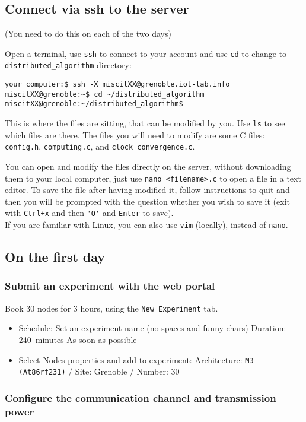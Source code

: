 \documentclass[oneside]{article}
\begin{document}
\subsection{Connect via ssh to the server}
(You need to do this on each of the two days)

Open a terminal, use \verb=ssh= to connect to your account and use \verb=cd= to change to \verb=distributed_algorithm= directory:
\begin{verbatim}your_computer:$ ssh -X miscitXX@grenoble.iot-lab.info
miscitXX@grenoble:~$ cd ~/distributed_algorithm
miscitXX@grenoble:~/distributed_algorithm$
\end{verbatim}
This is where the files are sitting, that can be modified by you.
Use \verb=ls= to see which files are there. 
The files you will need to modify are some C files: \verb=config.h=, \verb=computing.c=, and \verb=clock_convergence.c=.

You can open and modify the files directly on the server, without downloading
them to your local computer, just use \verb=nano <filename>.c= to open a file in
a text editor. To save the file after having modified it, follow instructions to
quit and then you will be prompted with the question whether you wish to save it
(exit with \verb=Ctrl+x= and then \verb='O'= and \verb=Enter= to save).\\
If you are familiar with Linux, you can also use \verb=vim= (locally), instead of \verb=nano=.

\subsection{On the first day}


\subsubsection{Submit an experiment with the web portal}
Book 30 nodes for 3 hours, using the \verb=New Experiment= tab.
\begin{itemize}
\item Schedule:
\subitem Set an experiment name (no spaces and funny chars)
\subitem Duration: 240~minutes
\subitem As soon as possible
\item Select Nodes properties and add to experiment: 
\subitem Architecture: \texttt{M3 (At86rf231)} / Site: Grenoble / Number: $30$
\end{itemize}

\subsubsection{Configure the communication channel and transmission power}
\label{subsec:config.h}
\end{document}
